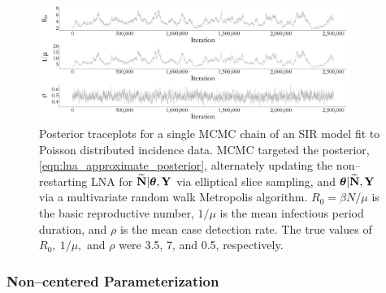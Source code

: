 \begin{figure}
\centering
\includegraphics[width=0.9\textwidth]{figures/lna_centered_traces}
\caption{Posterior traceplots for a single MCMC chain of an SIR model fit to Poisson distributed incidence data. MCMC targeted the posterior, \ref{eqn:lna_approximate_posterior}, alternately updating the non--restarting LNA for $ \widetilde{\mathbf{N}}|\boldsymbol{\theta},\mathbf{Y} $ via elliptical slice sampling, and $ \boldsymbol{\theta}|\widetilde{\mathbf{N}},\mathbf{Y} $ via a multivariate random walk Metropolis algorithm. $ R_0 = \beta N / \mu$ is the basic reproductive number, $ 1/\mu $ is the mean infectious period duration, and $ \rho $ is the mean case detection rate. The true values of $ R_0,\ 1/\mu,$ and $ \rho $ were 3.5, 7, and 0.5, respectively.}
\label{fig:lna_centered_traces}
\end{figure}

\subsubsection{Non--centered Parameterization}
\label{subsubsec:noncentered_parameterization}	

